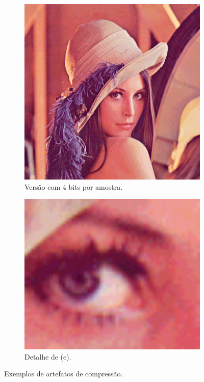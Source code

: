 \begin{figure}[!t]
  \begin{subfigure}{\WORIG}
    \centering
    \includegraphics[width=1\textwidth]{images/01/lena_12bit.png}
    \caption{\label{fig:compress:12bit} Versão com 4 bits por amostra.}
  \end{subfigure}
  \begin{subfigure}{\WDET}
    \centering
    \includegraphics[width=1\textwidth]{images/01/lena_12bit_eye.png}
    \caption{\label{fig:compress:12bit:eye} Detalhe de (e).}
  \end{subfigure}

  \caption{\label{fig:compress} Exemplos de artefatos de compressão.}
\end{figure}



